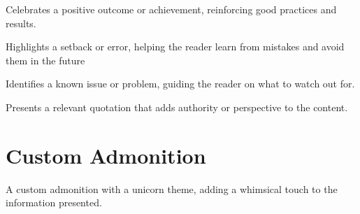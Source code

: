 \documentclass[twoside]{article}
\begin{document}
\begin{tscallout}[kind=success]
Celebrates a positive outcome or achievement, reinforcing good practices and results.
\end{tscallout}
\begin{tscallout}[kind=failure]
Highlights a setback or error, helping the reader learn from mistakes and avoid them in the future
\end{tscallout}
\begin{tscallout}[kind=bug]
Identifies a known issue or problem, guiding the reader on what to watch out for.
\end{tscallout}
\begin{tscallout}[kind=quote]
Presents a relevant quotation that adds authority or perspective to the content.
\end{tscallout}
\section*{Custom Admonition}
\begin{tscallout}[kind=unicorn]
A custom admonition with a unicorn theme, adding a whimsical touch to the information presented.
\end{tscallout}
\end{document}
